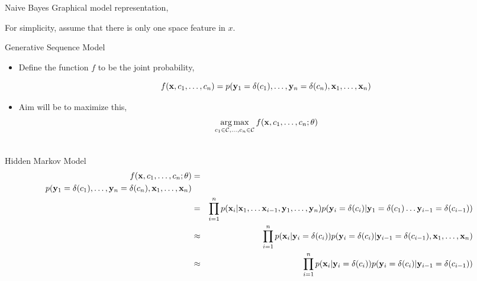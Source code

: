 \documentclass{beamer}
\begin{document}
\begin{frame}{Naive Bayes}
  Graphical model representation,
  \begin{center}
  \end{center}
  For simplicity,  assume that there is only one space feature in $x$.
\end{frame}



\begin{frame}{Generative Sequence Model}
  \begin{itemize}
  \item Define the function $f$ to be the joint probability,

  \[ f(\mathbf{x}, c_1, \ldots, c_n) = p(\mathbf{y}_1=\delta(c_1), \ldots, \mathbf{y}_n=\delta(c_n), \mathbf{x}_1, \ldots, \mathbf{x}_n) \] 

  \air 

  \item Aim will be to maximize this,
    \[ \argmax_{c_1 \in \mcC, \ldots, c_n\in \mcC} f(\boldx, c_1, \ldots, c_n; \theta)\]
  \end{itemize}

  \begin{eqnarray*}
  
  \end{eqnarray*}
  
\end{frame}

\begin{frame}{Hidden Markov Model}
  \begin{eqnarray*}
    f(\mathbf{x}, c_1, \ldots, c_n; \theta) &=& \\ p(\mathbf{y}_1=\delta(c_1), \ldots, \mathbf{y}_n=\delta(c_n), \mathbf{x}_1, \ldots, \mathbf{x}_n)  \\
    &=& \prod_{i=1}^n p(\mathbf{x}_i | \mathbf{x}_1, \ldots \mathbf{x}_{i-1}, \mathbf{y}_1, \ldots, \mathbf{y}_n) p(\mathbf{y}_i=\delta(c_i) | \mathbf{y}_1=\delta(c_1) \ldots \mathbf{y}_{i-1}=\delta(c_{i-1})) \\
    &\approx& \prod_{i=1}^n p(\mathbf{x}_i | \mathbf{y}_i = \delta(c_i)) p(\mathbf{y}_i=\delta(c_i) | \mathbf{y}_{i-1}=\delta(c_{i-1}), \mathbf{x}_1, \ldots, \mathbf{x}_n) \\
    &\approx& \prod_{i=1}^n p(\mathbf{x}_i | \mathbf{y}_i = \delta(c_i)) p(\mathbf{y}_i=\delta(c_i) | \mathbf{y}_{i-1}=\delta(c_{i-1})) \\
  \end{eqnarray*}
\end{frame}
\end{document}
